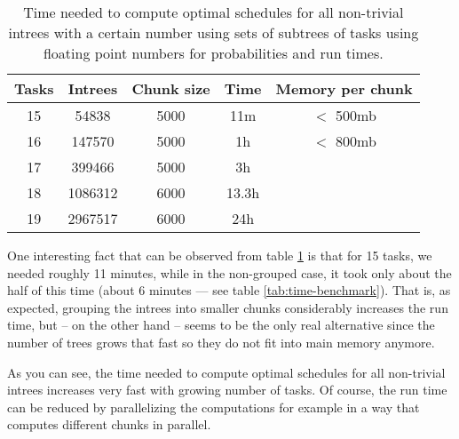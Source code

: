\begin{table}[ht]
  \centering
  \begin{tabular}[ht]{ccccc}
    Tasks & Intrees & Chunk size & Time & Memory per chunk \\
    \hline
    15 & 54838 & 5000 & 11m & $<$ 500mb \\
    16 & 147570 & 5000 & 1h & $<$ 800mb \\
    17 & 399466 & 5000 & 3h & \\
    18 & 1086312 & 6000 & 13.3h & \\
    19 & 2967517 & 6000 & 24h &
  \end{tabular}
  \caption{Time needed to compute optimal schedules for all non-trivial intrees  with a certain number using sets of subtrees of tasks using floating point numbers for probabilities and run times.}
  \label{tab:benchmark-clustered-run-time}
\end{table}

One interesting fact that can be observed from table \ref{tab:benchmark-clustered-run-time} is that for 15 tasks, we needed roughly 11 minutes, while in the non-grouped case, it took only about the half of this time (about 6 minutes --- see table \ref{tab:time-benchmark}). That is, as expected, grouping the intrees into smaller chunks considerably increases the run time, but -- on the other hand -- seems to be the only real alternative since the number of trees grows that fast so they do not fit into main memory anymore.

As you can see, the time needed to compute optimal schedules for all non-trivial intrees increases very fast with growing number of tasks. Of course, the run time can be reduced by parallelizing the computations for example in a way that computes different chunks in parallel.

